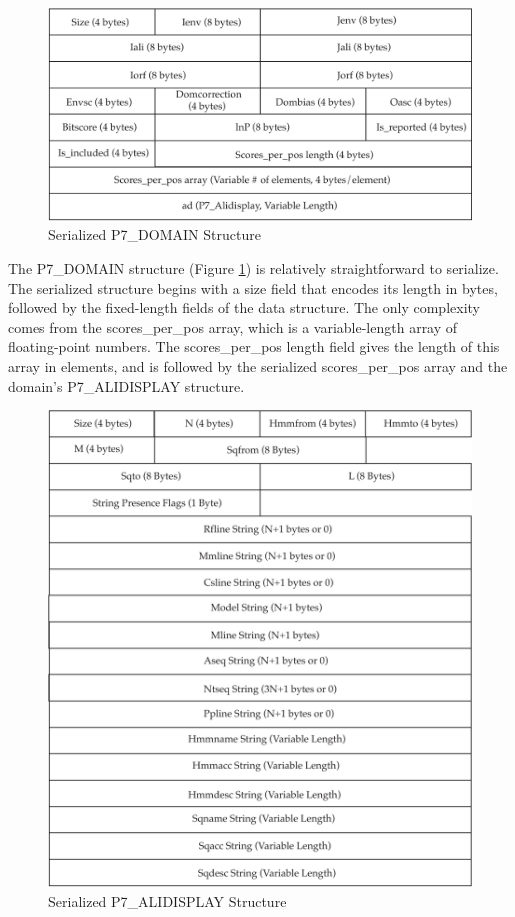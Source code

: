 \documentclass[notoc,justified,openany]{tufte-book}    %
\begin{document}
  \begin{figure}
    \includegraphics[width=\textwidth]{inclusions/domain-serialize.pdf}
    \caption{Serialized {P7\_DOMAIN} Structure}
    \label{fig:domain-serialize}
  \end{figure}

  The {P7\_DOMAIN} structure (Figure \ref{fig:domain-serialize}) is relatively straightforward to serialize.  The serialized structure begins with a size field that encodes its length in bytes, followed by the fixed-length fields of the data structure.  The only complexity comes from the scores\_per\_pos array, which is a variable-length array of floating-point numbers.  The scores\_per\_pos length field gives the length of this array in elements, and is followed by the serialized scores\_per\_pos array and the domain's {P7\_ALIDISPLAY} structure.
  \begin{figure}
    \includegraphics[width=\textwidth]{inclusions/alidisplay-serialize.pdf}
    \caption{Serialized {P7\_ALIDISPLAY} Structure}
    \label{fig:alidisplay-serialize}
  \end{figure}
\end{document}
